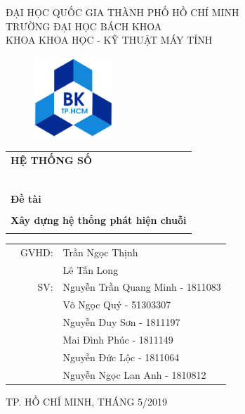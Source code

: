 \documentclass[a4paper]{article}
\begin{document}
\begin{titlepage}
\begin{center}
ĐẠI HỌC QUỐC GIA THÀNH PHỐ HỒ CHÍ MINH \\
TRƯỜNG ĐẠI HỌC BÁCH KHOA \\
KHOA KHOA HỌC - KỸ THUẬT MÁY TÍNH 
\end{center}

\vspace{1cm}

\begin{figure}[h!]
\begin{center}
\includegraphics[width=3cm]{hcmut.png}
\end{center}
\end{figure}

\vspace{1cm}


\begin{center}
\begin{tabular}{c}
\multicolumn{1}{l}{\textbf{{\Large HỆ THỐNG SỐ}}}\\
~~\\
\hline
\\
\multicolumn{1}{l}{\textbf{{\Large Đề tài}}}\\
\\
\textbf{{\Huge Xây dựng hệ thống phát hiện chuỗi}}\\
\\
\hline
\end{tabular}
\end{center}

\vspace{3cm}

\begin{table}[h]
\begin{tabular}{rrl}
\hspace{5 cm} & GVHD: & Trần Ngọc Thịnh\\
& & Lê Tấn Long\\
& SV: & Nguyễn Trần Quang Minh - 1811083 \\
& & Võ Ngọc Quý - 51303307 \\
& & Nguyễn Duy Sơn - 1811197\\
& & Mai Đình Phúc - 1811149\\
& & Nguyễn Đức Lộc - 1811064\\
& & Nguyễn Ngọc Lan Anh - 1810812\\
\end{tabular}
\end{table}

\begin{center}
{\footnotesize TP. HỒ CHÍ MINH, THÁNG 5/2019}
\end{center}
\end{titlepage}
\end{document}
